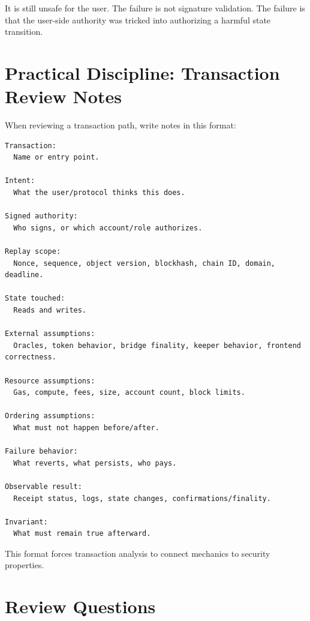 It is still unsafe for the user. The failure is not signature
validation. The failure is that the user-side authority was tricked into
authorizing a harmful state transition.

\section{Practical Discipline: Transaction Review Notes}

When reviewing a transaction path, write notes in this format:

\begin{lstlisting}
Transaction:
  Name or entry point.

Intent:
  What the user/protocol thinks this does.

Signed authority:
  Who signs, or which account/role authorizes.

Replay scope:
  Nonce, sequence, object version, blockhash, chain ID, domain, deadline.

State touched:
  Reads and writes.

External assumptions:
  Oracles, token behavior, bridge finality, keeper behavior, frontend correctness.

Resource assumptions:
  Gas, compute, fees, size, account count, block limits.

Ordering assumptions:
  What must not happen before/after.

Failure behavior:
  What reverts, what persists, who pays.

Observable result:
  Receipt status, logs, state changes, confirmations/finality.

Invariant:
  What must remain true afterward.
\end{lstlisting}

This format forces transaction analysis to connect mechanics to security
properties.

\section{Review Questions}

